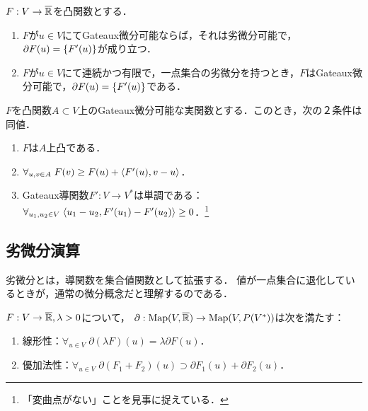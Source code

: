 \documentclass[uplatex,dvipdfmx]{jsreport}
\begin{document}
\begin{proposition}[Gateaux微分と劣微分の関係]
    $F:V\to\overline{\mathbb{R}}$を凸関数とする．
    \begin{enumerate}
        \item $F$が$u\in V$にてGateaux微分可能ならば，それは劣微分可能で，$\partial F(u)=\left\{F'(u)\right\}$が成り立つ．
        \item $F$が$u\in V$にて連続かつ有限で，一点集合の劣微分を持つとき，$F$はGateaux微分可能で，$\partial F(u)=\left\{F'(u)\right\}$である．
    \end{enumerate}
\end{proposition}

\begin{proposition}[Gateaux微分可能な関数が凸であることの特徴付け]
    $F$を凸関数$A\subset V$上のGateaux微分可能な実関数とする．このとき，次の２条件は同値．
    \begin{enumerate}
        \item $F$は$A$上凸である．
        \item $\forall_{u,v\in A}\;F(v)\ge F(u)+\langle F'(u),v-u\rangle$．
        \item Gateaux導関数$F':V\to V^*$は単調である：$\forall_{u_1,u_2\in V}\;\langle u_1-u_2,F'(u_1)-F'(u_2)\rangle\ge0$．\footnote{「変曲点がない」ことを見事に捉えている．}
    \end{enumerate}
\end{proposition}

\subsection{劣微分演算}

\begin{tcolorbox}[colframe=ForestGreen, colback=ForestGreen!10!white,breakable,colbacktitle=ForestGreen!40!white,coltitle=black,fonttitle=\bfseries\sffamily,
title=]
    劣微分とは，導関数を集合値関数として拡張する．
    値が一点集合に退化しているときが，通常の微分概念だと理解するのである．
\end{tcolorbox}

\begin{lemma}
    $F:V\to\overline{\mathbb{R}},\lambda>0$について，
    $\partial:\mathrm{Map}(V,\overline{\mathbb{R}})\to\mathrm{Map}(V,P(V^*))$は次を満たす：
    \begin{enumerate}
        \item 線形性：$\forall_{u\in V}\;\partial(\lambda F)(u)=\lambda \partial F(u)$．
        \item 優加法性：$\forall_{u\in V}\;\partial(F_1+F_2)(u)\supset\partial F_1(u)+\partial F_2(u)$．
    \end{enumerate}
\end{lemma}
\end{document}
